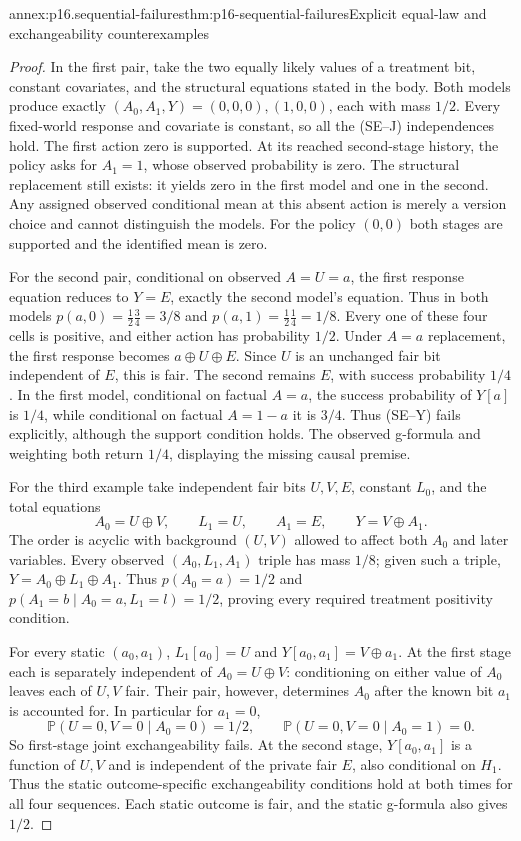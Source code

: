 \begin{annexitem}{annex:p16.sequential-failures}{thm:p16-sequential-failures}{Explicit equal-law and exchangeability counterexamples}
\begin{proof}
In the first pair, take the two equally likely values of a treatment bit,
constant covariates, and the structural equations stated in the body.
Both models produce exactly \((A_0,A_1,Y)=(0,0,0),(1,0,0)\), each with
mass \(1/2\). Every fixed-world response and covariate is constant, so
all the (SE--J) independences hold. The first action zero is supported.
At its reached second-stage history, the policy asks for \(A_1=1\),
whose observed probability is zero. The structural replacement still
exists: it yields zero in the first model and one in the second. Any
assigned observed conditional mean at this absent action is merely a
version choice and cannot distinguish the models. For the policy \((0,0)\)
both stages are supported and the identified mean is zero.

For the second pair, conditional on observed \(A=U=a\), the first
response equation reduces to \(Y=E\), exactly the second model's
equation. Thus in both models \(p(a,0)=\frac12\frac34=3/8\) and
\(p(a,1)=\frac12\frac14=1/8\). Every one of these four cells is
positive, and either action has probability \(1/2\). Under \(A=a\)
replacement, the first response becomes \(a\oplus U\oplus E\).
Since \(U\) is an unchanged fair bit independent of \(E\), this is
fair. The second remains \(E\), with success probability \(1/4\).
In the first model, conditional on factual \(A=a\), the success
probability of \(Y[a]\) is \(1/4\), while conditional on factual
\(A=1-a\) it is \(3/4\). Thus (SE--Y) fails explicitly, although
the support condition holds. The observed g-formula and weighting both
return \(1/4\), displaying the missing causal premise.

For the third example take independent fair bits \(U,V,E\), constant
\(L_0\), and the total equations
\[
 A_0=U\oplus V,\qquad L_1=U,\qquad A_1=E,
 \qquad Y=V\oplus A_1.
\]
The order is acyclic with background \((U,V)\) allowed to affect both
\(A_0\) and later variables. Every observed \((A_0,L_1,A_1)\) triple
has mass \(1/8\); given such a triple, \(Y=A_0\oplus L_1\oplus A_1\).
Thus \(p(A_0=a)=1/2\) and
\(p(A_1=b\mid A_0=a,L_1=l)=1/2\), proving every required treatment
positivity condition.

For every static \((a_0,a_1)\),
\(L_1[a_0]=U\) and \(Y[a_0,a_1]=V\oplus a_1\). At the first stage
each is separately independent of \(A_0=U\oplus V\): conditioning on
either value of \(A_0\) leaves each of \(U,V\) fair. Their pair,
however, determines \(A_0\) after the known bit \(a_1\) is accounted
for. In particular for \(a_1=0\),
\[
 \mathbb P(U=0,V=0\mid A_0=0)=1/2,
 \qquad\mathbb P(U=0,V=0\mid A_0=1)=0.
\]
So first-stage joint exchangeability fails. At the second stage,
\(Y[a_0,a_1]\) is a function of \(U,V\) and is independent of the
private fair \(E\), also conditional on \(H_1\). Thus the static
outcome-specific exchangeability conditions hold at both times for all
four sequences. Each static outcome is fair, and the static g-formula
also gives \(1/2\).


\end{proof}
\end{annexitem}
